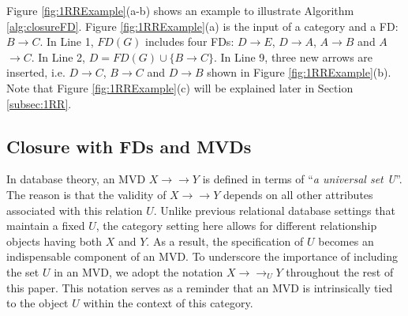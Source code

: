 \begin{example} Figure \ref{fig:1RRExample}(a-b) shows an example to illustrate  Algorithm \ref{alg:closureFD}. Figure \ref{fig:1RRExample}(a) is the input of a category and a FD: $B \to C$.  In Line 1, $FD(G)$ includes four FDs:  $D$$\to$$E$, $D$$\to$$A$, $A$$\to$$B$ and $A$$\to$$C$.  In Line 2, $D = FD(G) \cup \{B \to C\}$. In Line 9, three new arrows are inserted, i.e. $D \to C$, $B \to C$ and $D \to B$ shown in Figure \ref{fig:1RRExample}(b). Note that Figure \ref{fig:1RRExample}(c) will be explained later in Section 
\ref{subsec:1RR}. \end{example}




\subsection{Closure with FDs and MVDs}



In database theory, an MVD $X \to\to Y$ is defined in terms of  ``\textit{a universal set U}''. The reason is that the validity of  $X \to\to Y$ depends on all other attributes associated with this relation $U$.  Unlike previous relational database settings that maintain a fixed $U$, the category setting here allows for different relationship objects having both $X$ and $Y$. As a result, the specification of $U$ becomes an indispensable component of an MVD. To underscore the importance of including the set $U$ in an MVD, we adopt the notation $X \to\to_U Y$ throughout the rest of this paper. This notation serves as a reminder that an MVD is intrinsically tied to the object $U$ within the context of this category.


